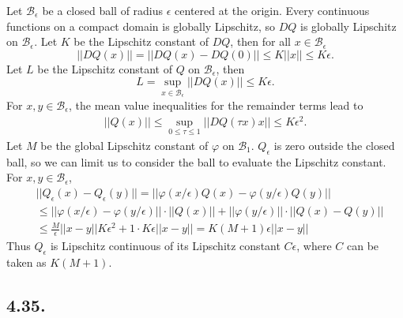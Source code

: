 \documentclass[a4paper,11pt,fleqn]{article}
\begin{document}
Let $\mathcal{B}_\epsilon$ be a closed ball of radius $\epsilon$ centered at the origin. Every continuous functions on a compact domain is globally Lipschitz, so $DQ$ is globally Lipschitz on $\mathcal{B}_\epsilon$. Let $K$ be the Lipschitz constant of $DQ$, then for all $x \in \mathcal{B}_\epsilon$ 
\begin{equation}
    ||DQ(x)|| = ||DQ(x) - DQ(0)|| \le K||x|| \le K\epsilon. 
\end{equation}
Let $L$ be the Lipschitz constant of $Q$ on $\mathcal{B}_\epsilon$, then~\cite[Lem.~3.1]{pathak2018introduction}
\begin{equation}
    L = \sup_{x\in\mathcal{B}_\epsilon}||DQ(x)||\le K\epsilon.
\end{equation}
For $x, y \in \mathcal{B}_\epsilon$, the mean value inequalities for the remainder terms lead to 
\begin{align}
    ||Q(x)||\le \sup_{0\le \tau \le 1}{||DQ(\tau x)x||}\le K\epsilon^2.
\end{align}
Let $M$ be the global Lipschitz constant of $\varphi$ on $\mathcal{B}_1$. $Q_{\epsilon}$ is zero outside the closed ball, so we can limit us to consider the ball to evaluate the Lipschitz constant. For $x,y \in \mathcal{B}_\epsilon$, 
\begin{align}
    &||Q_\epsilon(x)-Q_\epsilon(y)|| = ||\varphi(x/\epsilon)Q(x)-\varphi(y/\epsilon)Q(y)|| \nonumber \\
    &\le ||\varphi(x/\epsilon)-\varphi(y/\epsilon)||\cdot ||Q(x)|| + ||\varphi(y/\epsilon)||\cdot ||Q(x)-Q(y)|| \nonumber \\
    & \le \frac{M}{\epsilon}||x-y||K\epsilon^2+1\cdot K\epsilon||x-y||=K(M+1)\epsilon||x-y||
\end{align}
Thus $Q_\epsilon$ is Lipschitz continuous of its Lipschitz constant $C\epsilon$, where $C$ can be taken as $K(M+1)$. 
\hruleskip

\subsection{4.35.}

\end{document}
